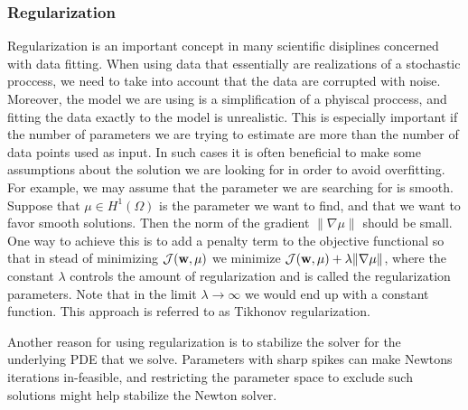 \subsubsection{Regularization}
Regularization is an important concept in many scientific disiplines
concerned with data fitting. When using data that essentially are
realizations of a stochastic proccess, we need to take into account
that the data are corrupted with noise. Moreover, the model we are using
is a simplification of a phyiscal proccess, and fitting the
data exactly to the model is unrealistic. This is especially
important if the number of parameters we are trying to estimate are
more than the number of data points used as input. In such cases it is often
beneficial to make some assumptions about the solution we are looking
for in order to avoid overfitting. For example, we may assume that the
parameter we are searching for is smooth. Suppose that $\mu \in
H^1(\Omega)$ is the parameter we want to find, and that we want to
favor smooth solutions. Then the norm of the gradient $\| \nabla \mu
\|$ should be small. One way to achieve this is to add a penalty term
to the objective functional so that in stead of minimizing
$\mathcal{J}(\mathbf{w}, \mu)$ we minimize $\mathcal{J}(\mathbf{w}, \mu) +
\lambda \| \nabla \mu\|$, where the constant $\lambda$ controls the
amount of regularization and is called the regularization parameters.
Note that in the limit $\lambda \rightarrow \infty$ we would end up
with a constant function. This approach is referred to as Tikhonov
regularization.

Another reason for using regularization is to stabilize the solver for
the underlying PDE that we solve. Parameters with sharp spikes
can make Newtons iterations in-feasible, and restricting the
parameter space to exclude such solutions might help stabilize the
Newton solver. 






